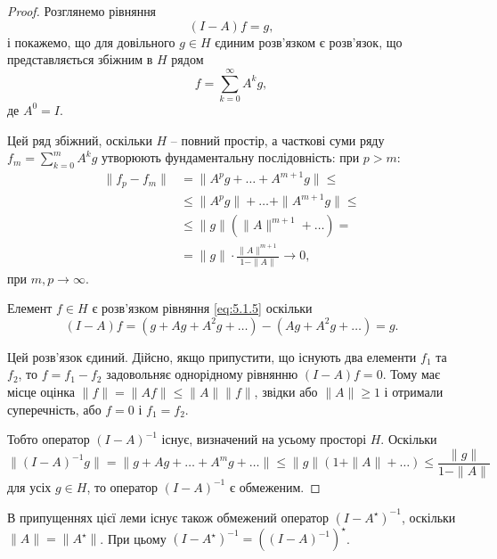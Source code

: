\begin{proof}
    Розглянемо рівняння
    \begin{equation}
        \label{eq:5.1.5}
        (I - A) f = g,
    \end{equation}
    і покажемо, що для довільного $g \in H$ єдиним розв'язком є розв'язок, що представляється збіжним в $H$ рядом
    \begin{equation}
        \label{eq:5.1.6}
        f = \sum_{k = 0}^\infty A^k g,
    \end{equation}
    де $A^0 = I$. \medskip

    Цей ряд збіжний, оскільки $H$ -- повний простір, а часткові суми ряду  $f_m = \sum_{k = 0}^m A^k g$ утворюють фундаментальну послідовність: при $p > m$:
    \begin{align*}
        \|f_p - f_m\|
        &= \|A^p g + \ldots + A^{m + 1} g\| \le \\
        &\le \|A^p g\| + \ldots + \|A^{m + 1} g\| \le \\
        &\le \|g\| \left( \|A\|^{m + 1} + \ldots \right) = \\
        &= \|g\| \cdot \frac{\|A\|^{m + 1}}{1 - \|A\|} \to 0,
    \end{align*}
    при $m, p \to \infty$. \medskip

    Елемент $f \in H$ є розв'язком рівняння \eqref{eq:5.1.5} оскільки
    \begin{equation*}
        (I - A) f = (g + A g + A^2 g + \ldots) - (A g + A^2 g + \ldots) = g.    
    \end{equation*}

    Цей розв'язок єдиний. Дійсно, якщо припустити, що існують два елементи $f_1$ та $f_2$, то $f = f_1 - f_2$ задовольняє однорідному рівнянню $(I - A) f = 0$. Тому має місце оцінка $\|f\| = \|A f\| \le \|A\| \|f\|$, звідки або $\|A\| \ge 1$ і отримали суперечність, або $f = 0$ і $f_1 = f_2$. \medskip

    Тобто оператор $(I - A)^{-1}$ існує, визначений на усьому просторі $H$. Оскільки
    \begin{equation*}
        \|(I - A)^{-1} g\| = \|g + A g + \ldots + A^m g + \ldots\| \le \|g\| (1 + \|A\| + \ldots) \le \frac{\|g\|}{1 - \|A\|}
    \end{equation*}
    для усіх $g \in H$, то оператор $(I - A)^{-1}$ є обмеженим. 
\end{proof}

\begin{remark}
    В припущеннях цієї леми існує також обмежений оператор $(I - A^\star)^{-1}$, оскільки $\|A\| = \|A^\star\|$. При цьому $(I - A^\star)^{-1} = \left( (I - A)^{-1} \right)^\star$.
\end{remark}

